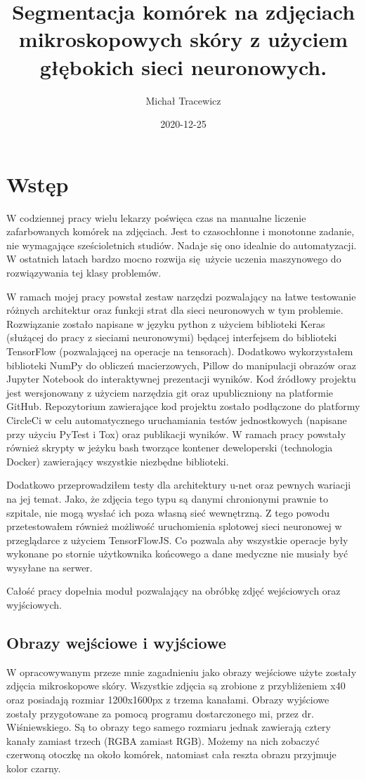 \documentclass{article}
\title{Segmentacja komórek na zdjęciach mikroskopowych skóry z użyciem głębokich sieci neuronowych.}
\date{2020-12-25}
\author{Michał Tracewicz}
\begin{document}
\maketitle
\newpage
\tableofcontents
\newpage
\section{Wstęp}
W codziennej pracy wielu lekarzy poświęca czas na manualne liczenie zafarbowanych komórek na zdjęciach.
Jest to czasochłonne i monotonne zadanie, nie wymagające sześcioletnich studiów.
Nadaje się ono idealnie do automatyzacji.
W ostatnich latach bardzo mocno rozwija się użycie uczenia maszynowego do rozwiązywania tej klasy problemów.

W ramach mojej pracy powstał zestaw narzędzi pozwalający na łatwe testowanie różnych architektur oraz funkcji strat dla sieci neuronowych w tym problemie.
Rozwiązanie zostało napisane w języku python z użyciem biblioteki Keras (służącej do pracy z sieciami neuronowymi) będącej interfejsem do biblioteki TensorFlow (pozwalającej na operacje na tensorach).
Dodatkowo wykorzystałem biblioteki NumPy do obliczeń macierzowych, Pillow do manipulacji obrazów oraz Jupyter Notebook do interaktywnej prezentacji wyników.
Kod źródłowy projektu jest wersjonowany z użyciem narzędzia git oraz upubliczniony na platformie GitHub.
Repozytorium zawierające kod projektu zostało podłączone do platformy CircleCi w celu automatycznego uruchamiania testów jednostkowych (napisane przy użyciu PyTest i Tox) oraz publikacji wyników.
W ramach pracy powstały również skrypty w jeżyku bash tworzące kontener deweloperski (technologia Docker) zawierający wszystkie niezbędne biblioteki.

Dodatkowo przeprowadziłem testy dla architektury u-net oraz pewnych wariacji na jej temat.
Jako, że zdjęcia tego typu są danymi chronionymi prawnie to szpitale, nie mogą wysłać ich poza własną sieć wewnętrzną.
Z tego powodu przetestowałem również możliwość uruchomienia splotowej sieci neuronowej w przeglądarce z użyciem TensorFlowJS.
Co pozwala aby wszystkie operacje były wykonane po stornie użytkownika końcowego a dane medyczne nie musiały być wysyłane na serwer.

Całość pracy dopełnia moduł pozwalający na obróbkę zdjęć wejściowych oraz wyjściowych.
\subsection{Obrazy wejściowe i wyjściowe}
W opracowywanym przeze mnie zagadnieniu jako obrazy wejściowe użyte zostały zdjęcia mikroskopowe skóry.
Wszystkie zdjęcia są zrobione z przybliżeniem x40 oraz posiadają rozmiar 1200x1600px z trzema kanałami.
Obrazy wyjściowe zostały przygotowane za pomocą programu dostarczonego mi, przez dr. Wiśniewskiego.
Są to obrazy tego samego rozmiaru jednak zawierają cztery kanały zamiast trzech (RGBA zamiast RGB).
Możemy na nich zobaczyć czerwoną otoczkę na około komórek, natomiast cała reszta obrazu przyjmuje kolor czarny.
\newpage
\end{document}
